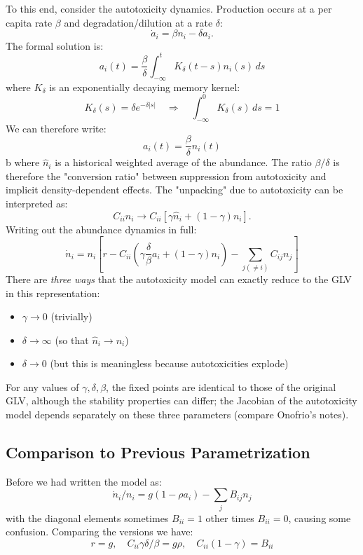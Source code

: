 \documentclass[11pt,a4paper,fleqn]{scrartcl}
\begin{document}
To this end, consider the autotoxicity dynamics. Production occurs at a per capita rate $\beta$ and degradation/dilution at a rate $\delta$:
\begin{equation}
\dot{a}_i = \beta n_i - \delta a_i.
\end{equation}
The formal solution is:
\begin{equation}
a_i(t) = \frac{\beta}{\delta} \int_{-\infty}^t K_\delta(t-s) n_i(s)\, ds
\end{equation}
where $K_\delta$ is an exponentially decaying memory kernel:
\begin{equation}
K_\delta(s) = \delta e^{-\delta|s|} \quad \Rightarrow \quad \int_{-\infty}^0 K_\delta(s)\, ds = 1
\end{equation}
We can therefore write:
\begin{equation}
a_i(t) = \frac{\beta}{\delta}\hat{n}_i(t)
\end{equation}b
where $\hat{n}_i$ is a historical weighted average of the abundance. The ratio $\beta/\delta$ is therefore the "conversion ratio" between suppression from autotoxicity and implicit density-dependent effects. The "unpacking" due to autotoxicity can be interpreted as:
\begin{equation}
C_{ii}n_i \rightarrow C_{ii}\left[ \gamma \hat{n}_i + (1-\gamma)n_i \right].
\end{equation}
Writing out the abundance dynamics in full:
\begin{equation}
\dot{n}_i = n_i\left[ r - C_{ii} \left(\gamma \frac{\delta}{\beta}a_i + (1-\gamma)n_i\right) - \sum_{j(\neq i)} C_{ij} n_j \right]
\end{equation}
There are \emph{three ways} that the autotoxicity model can exactly reduce to the GLV in this representation:
\begin{itemize}
  \item $\gamma \to 0$ (trivially)
  \item $\delta \to \infty$ (so that $\hat{n}_i \to n_i$)
  \item $\delta \to 0$ (but this is meaningless because autotoxicities explode)
\end{itemize}
For any values of $\gamma,\delta,\beta$, the fixed points are identical to those of the original GLV, although the stability properties can differ; the Jacobian of the autotoxicity model depends separately on these three parameters (compare Onofrio's notes).

\subsection{Comparison to Previous Parametrization}
Before we had written the model as:
\begin{equation}
\dot{n}_i / n_i = g ( 1 - \rho a_i ) - \sum_{j} B_{ij} n_j
\end{equation}
with the diagonal elements sometimes $B_{ii}=1$ other times $B_{ii}=0$, causing some confusion. Comparing the versions we have:
\begin{equation}
r=g, \quad C_{ii} \gamma \delta/\beta = g \rho, \quad C_{ii}(1-\gamma) = B_{ii}
\end{equation}
\end{document}
